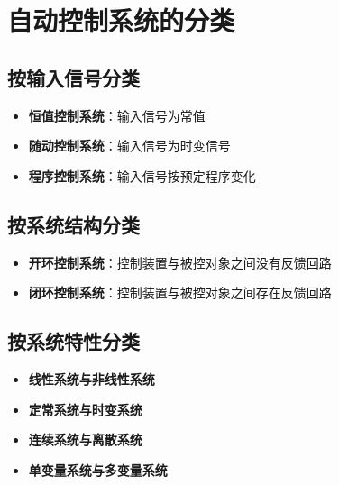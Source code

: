 \section{自动控制系统的分类}

\subsection{按输入信号分类}
\begin{itemize}
    \item \textbf{恒值控制系统}：输入信号为常值
    \item \textbf{随动控制系统}：输入信号为时变信号
    \item \textbf{程序控制系统}：输入信号按预定程序变化
\end{itemize}

\subsection{按系统结构分类}
\begin{itemize}
    \item \textbf{开环控制系统}：控制装置与被控对象之间没有反馈回路
    \item \textbf{闭环控制系统}：控制装置与被控对象之间存在反馈回路
\end{itemize}

\subsection{按系统特性分类}
\begin{itemize}
    \item \textbf{线性系统与非线性系统}
    \item \textbf{定常系统与时变系统}
    \item \textbf{连续系统与离散系统}
    \item \textbf{单变量系统与多变量系统}
\end{itemize}

